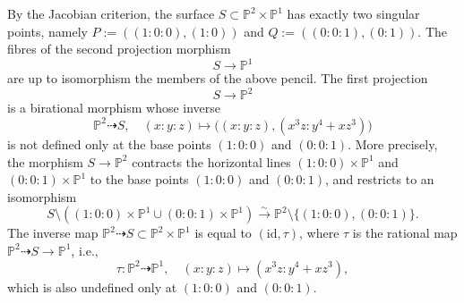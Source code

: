 \documentclass[12pt,reqno]{amsart}
\theoremstyle{definition}
\newcommand{\ttto}{\dashrightarrow} %
\newcommand{\tto}{\longrightarrow}
\newcommand{\PP}{\mathbb{P}}
\begin{document}
By the Jacobian criterion, the surface $S\subset \PP^2 \times \PP^1$ has exactly two singular points, namely $P:=((1:0:0),(1:0))$ and $Q:=((0:0:1),(0:1))$. The fibres of the second projection morphism
\[ S\tto \PP^1 \]
are up to isomorphism the members of the above pencil.
The first projection
\[ S\tto \PP^2 \]
is a birational morphism whose inverse
\[ \PP^2 \ttto S, \quad (x:y:z) \mapsto \big( (x:y:z),(x^3 z : y^4 + x z^3) \big) \]
is not defined only at the base points $(1:0:0)$ and $(0:0:1)$.
More precisely, the morphism $S \to \PP^2$ contracts the horizontal lines $(1:0:0) \times \PP^1$ and $(0:0:1) \times \PP^1$ to the base points $(1:0:0)$ and $(0:0:1)$, and restricts to an isomorphism
\[ S \setminus ( (1:0:0) \times \PP^1 \cup (0:0:1) \times \PP^1 )  \overset \sim \tto \PP^2 \setminus \{ (1:0:0),(0:0:1) \}. \]
The inverse map $\PP^2 \ttto S \subset \PP^2 \times \PP^1$ is equal to $(\textrm{id},\tau)$, where $\tau$ is the rational map $\PP^2 \ttto S \to \PP^1$, i.e.,
\[ \tau: \PP^2 \ttto \PP^1, \quad (x:y:z) \mapsto (x^3 z : y^4 + x z^3), \]
which is also undefined only at $(1:0:0)$ and $(0:0:1)$.
\end{document}
